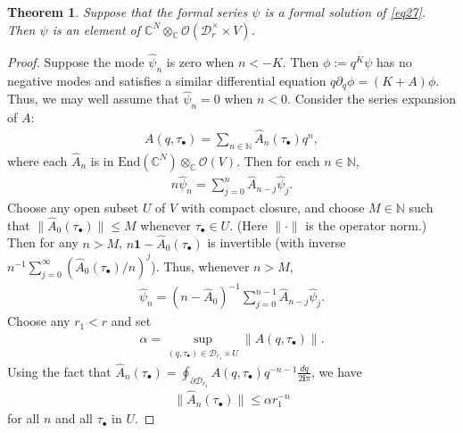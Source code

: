\documentclass[12pt,a4paper,notitlepage]{report}
\theoremstyle{definition}
\theoremstyle{plain}
\newtheorem{thm}[df]{Theorem}
\newcommand{\mc}{\mathcal}
\newcommand{\wht}{\widehat}
\newcommand{\ovl}{\overline}
\newcommand{\End}{\mathrm{End}} %
\newcommand{\id}{\mathbf{1}}
\newcommand{\scr}{\mathscr}
\newcommand{\im}{\mathbf{i}}
\newcommand{\mbb}{\mathbb}
\newcommand{\blt}{\bullet}
\newcommand{\Cbb}{\mathbb C}
\numberwithin{equation}{section}
\begin{document}
\begin{thm}\label{lb14}
Suppose that the formal series $\psi$ is a formal solution of \eqref{eq27}. Then $\psi$ is an element of $\Cbb^N\otimes_\Cbb\scr O(\mc D_r^\times\times V)$.
\end{thm}

\begin{proof}
Suppose the mode $\wht\psi_n$ is zero when $n<-K$. Then $\phi:=q^K\psi$ has no negative modes and satisfies a similar differential equation $q\partial_q\phi=(K+A)\phi$. Thus,  we may well assume that $\wht\psi_n=0$ when $n<0$. Consider the series expansion of $A$:
\begin{align*}
A(q,\tau_\blt)=\sum_{n\in\mbb N}\wht A_n(\tau_\blt)q^n,
\end{align*}
where each $\wht A_n$ is  in $\End(\Cbb^N)\otimes_\Cbb\scr O(V)$.  Then for each $n\in\mbb N$,
\begin{align*}
n\wht\psi_n=\sum_{j=0}^n\wht A_{n-j}\wht\psi_j.
\end{align*}
Choose any open subset $U$ of $V$ with compact closure, and choose $M\in\mbb N$ such that $\lVert\wht A_0(\tau_\bullet)\lVert\leq M$ whenever $\tau_\blt\in U$. (Here $\lVert\cdot\lVert$ is the operator norm.) Then for any $n>M$, $n\id-\wht A_0(\tau_\blt)$ is invertible (with inverse $n^{-1}\sum_{j=0}^\infty(\wht A_0(\tau_\blt)/n)^j $). Thus, whenever $n>M$,
\begin{align}
\wht\psi_n=(n-\wht A_0)^{-1}\sum_{j=0}^{n-1}\wht A_{n-j}\wht\psi_j.\label{eq25}
\end{align}
Choose any $r_1<r$ and set
\begin{align}
\alpha=\sup_{(q,\tau_\blt)\in {\ovl{\mc D_{r_1}}\times U}}\lVert A(q,\tau_\blt)\lVert.\label{eq28}
\end{align}
Using the fact that $\wht A_n(\tau_\blt)=\oint_{\partial \mc D_{r_1}} A(q,\tau_\blt)q^{-n-1}\frac{dq}{2\im\pi}$, we have
\begin{align}
\lVert\wht A_n(\tau_\blt)\lVert \leq \alpha r_1^{-n}\label{eq222}
\end{align}
for all $n$ and all  $\tau_\blt$ in $U$.



\end{proof}
\end{document}
